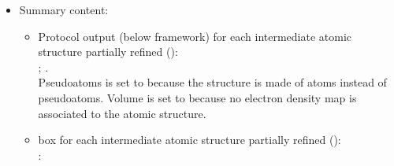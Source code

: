 \begin{itemize}
  \item Summary content:
  
   \begin{itemize}
     \item Protocol output (below \scipion framework) for each \coot intermediate atomic structure partially refined ():\\ ; .\\Pseudoatoms is set to  because the structure is made of atoms instead of pseudoatoms. Volume is set to  because no electron density map is associated to the atomic structure.
     \item {} box for each \coot intermediate atomic structure partially refined ():\\:
    \end{itemize}
    
\end{itemize}


